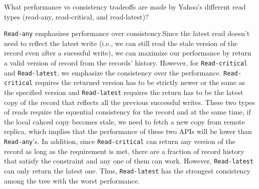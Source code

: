 \begin{QandA}
   \item What performance vs consistency tradeoffs are made by Yahoo's different read types (read-any, read-critical, and read-latest)?
         \begin{answered}
    	 \texttt{Read-any} emphasizes performance over consistency.Since the latest read doesn't need to reflect the latest write (i.e.,
    	 we can still read the stale version of the record even after a sucessful write), we can maximize our performance by return a valid
    	 version of record from the records' history. However, for \texttt{Read-critical} and \texttt{Read-latest}, we emphasize the consistency
    	 over the performance. \texttt{Read-critical} requires the returned version has to be strictly newer or the same as the specified version
    	 and \texttt{Read-latest} requires the return has to be the latest copy of the record that reflects all the previous successful writes.
    	 These two types of reads require the squential consistency for the record and at the same time, if the local cahced copy becomes stale,
    	 we need to fetch a new copy from remote replica, which implies that the performance of these two APIs will be lower than \texttt{Read-any}'s. In addition, since \texttt{Read-critical} can return any version of the record as long as the requirement is met, there
    	 are a fraction of record history that satisfy the constraint and any one of them can work. However, \texttt{Read-latest} can only return
    	 the latest one. Thus, \texttt{Read-latest} has the strongest consistency among the tree with the worst performance.
         \end{answered}
\end{QandA}